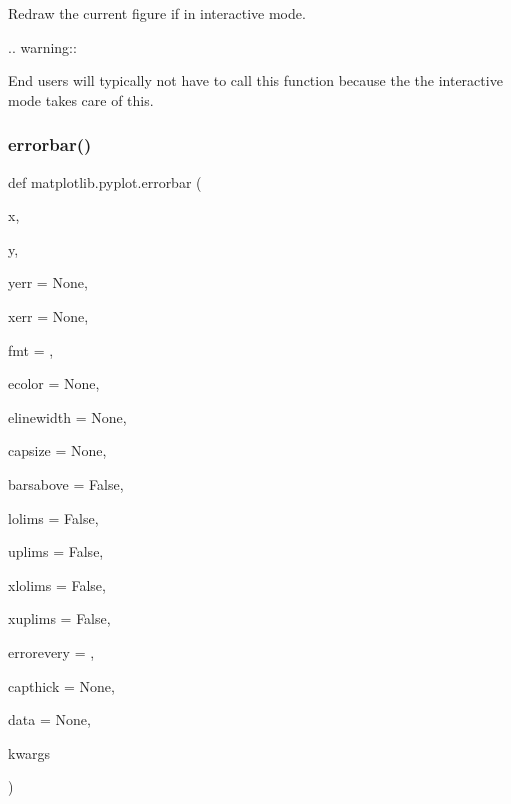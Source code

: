 \begin{DoxyVerb}Redraw the current figure if in interactive mode.

.. warning::

    End users will typically not have to call this function because the
    the interactive mode takes care of this.
\end{DoxyVerb}
 \mbox{\label{namespacematplotlib_1_1pyplot_a29f39a08a0156f1ad916c9a6d5092fbc}} 
\subsubsection{\texorpdfstring{errorbar()}{errorbar()}}
{\footnotesize\ttfamily def matplotlib.\+pyplot.\+errorbar (\begin{DoxyParamCaption}\item[{}]{x,  }\item[{}]{y,  }\item[{}]{yerr = {\ttfamily None},  }\item[{}]{xerr = {\ttfamily None},  }\item[{}]{fmt = {\ttfamily \textquotesingle{}\textquotesingle{}},  }\item[{}]{ecolor = {\ttfamily None},  }\item[{}]{elinewidth = {\ttfamily None},  }\item[{}]{capsize = {\ttfamily None},  }\item[{}]{barsabove = {\ttfamily False},  }\item[{}]{lolims = {\ttfamily False},  }\item[{}]{uplims = {\ttfamily False},  }\item[{}]{xlolims = {\ttfamily False},  }\item[{}]{xuplims = {\ttfamily False},  }\item[{}]{errorevery = {},  }\item[{}]{capthick = {\ttfamily None},  }\item[{}]{data = {\ttfamily None},  }\item[{}]{kwargs }\end{DoxyParamCaption})}

\mbox{\label{namespacematplotlib_1_1pyplot_a977ce9a1ce5c5bc0f8c5dca5d7c57d4d}} 
